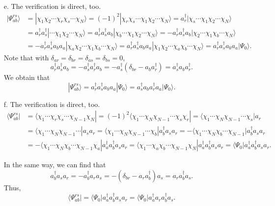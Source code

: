 \documentclass[a4paper]{book}
\newcounter{solution}[chapter]
\begin{document}
\begin{solution}
\begin{itemize}
	
	\item[e.] The verification is direct, too.
	\begin{align*}
		| \Psi^{rs}_{ab} \rangle &= | \chi_1 \chi_2 \cdots \chi_r \chi_s \cdots \chi_N \rangle = (-1)^2 | \chi_r \chi_s \cdots \chi_1 \chi_2 \cdots \chi_N \rangle = a^\dagger_r | \chi_s \cdots \chi_1 \chi_2 \cdots \chi_N \rangle \\
		&= a^\dagger_r a^\dagger_s | \cdots \chi_1 \chi_2 \cdots \chi_N \rangle = a^\dagger_r a^\dagger_s a_b | \chi_b \cdots \chi_1 \chi_2 \cdots \chi_N \rangle = - a^\dagger_r a^\dagger_s a_b | \chi_2 \cdots \chi_1 \chi_b \cdots \chi_N \rangle \\
		&= - a^\dagger_r a^\dagger_s a_b a_a | \chi_a \chi_2 \cdots \chi_1 \chi_b \cdots \chi_N \rangle = a^\dagger_r a^\dagger_s a_b a_a | \chi_1 \chi_2 \cdots \chi_a \chi_b \cdots \chi_N \rangle = a^\dagger_r a^\dagger_s a_b a_a | \Psi_0 \rangle .
	\end{align*}		
	Note that with $\delta_{ar} = \delta_{br} = \delta_{as} = \delta_{bs} = 0$, 
	\[
		a^\dagger_r a^\dagger_s a_b = - a^\dagger_s a^\dagger_r a_b = - a^\dagger_s ( \delta_{br} - a_b a^\dagger_r ) = a^\dagger_s a_b a^\dagger_r .
	\]
	We obtain that
	\[
		| \Psi^{rs}_{ab} \rangle = a^\dagger_r a^\dagger_s a_b a_a | \Psi_0 \rangle = a^\dagger_s a_b a^\dagger_r a_a | \Psi_0 \rangle .
	\]
	
	\item[f.] The verification is direct, too.
	\begin{align*}
		\langle \Psi^{rs}_{ab} | &= \langle \chi_1 \cdots \chi_r \chi_s \cdots \chi_{N-1} \chi_N | = (-1)^2 \langle \chi_1 \cdots \chi_N \chi_{N-1} \cdots \chi_s \chi_r | = \langle \chi_1 \cdots \chi_N \chi_{N-1} \cdots \chi_s | a_r \\
		&= \langle \chi_1 \cdots \chi_N \chi_{N-1} \cdots | a_s a_r = \langle \chi_1 \cdots \chi_N \chi_{N-1} \cdots \chi_b | a^\dagger_b a_s a_r = - \langle \chi_1 \cdots \chi_N \chi_b \cdots \chi_{N-1} | a^\dagger_b a_s a_r \\
		&= - \langle \chi_1 \cdots \chi_N \chi_b \cdots \chi_{N-1} \chi_a | a^\dagger_a a^\dagger_b a_s a_r = \langle \chi_1 \cdots \chi_a \chi_b \cdots \chi_{N-1} \chi_N | a^\dagger_a a^\dagger_b a_s a_r = \langle \Psi_0 | a^\dagger_a a^\dagger_b a_s a_r .
	\end{align*}
	
	In the same way, we can find that
	\[
		a^\dagger_b a_s a_r = - a^\dagger_b a_r a_s = - ( \delta_{br} - a_r a^\dagger_b ) a_s = a_r a^\dagger_b a_s .
	\]	
	Thus, 
	\[
		\langle \Psi^{rs}_{ab} | = \langle \Psi_0 | a^\dagger_a a^\dagger_b a_s a_r = \langle \Psi_0 | a^\dagger_a a_r a^\dagger_b a_s .
	\]
	
	\end{itemize}
	
	\end{solution}
	
\end{document}
